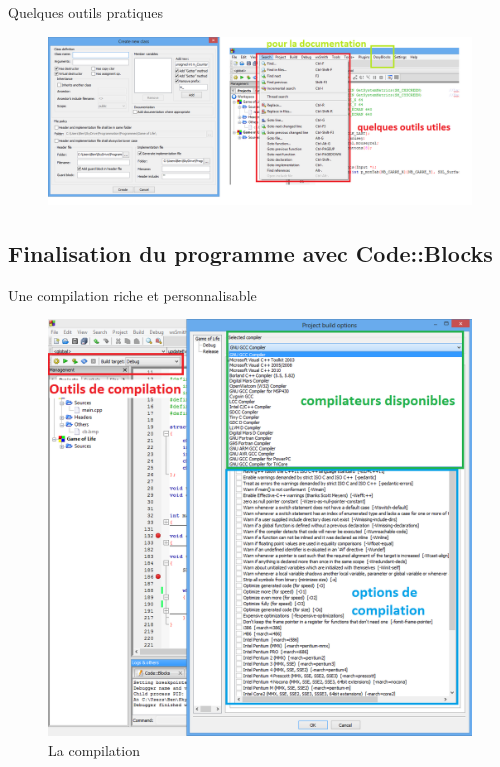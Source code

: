 \documentclass{beamer}
\begin{document}
\begin{frame}{Quelques outils pratiques}
\begin{figure}
\includegraphics[scale=0.30]{../images/cb05.png}
\label{cb05}				
\end{figure}
\end{frame}


\subsection{Finalisation du programme avec Code::Blocks}

\begin{frame}{Une compilation riche et personnalisable}
\begin{figure}
\includegraphics[scale=0.25]{../images/cb06.png}
\caption{La compilation}				
\label{cb06}				
\end{figure}
\end{frame}
\end{document}
